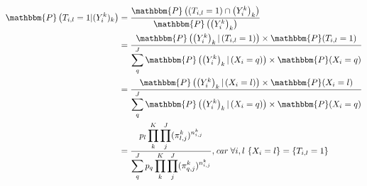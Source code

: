 \documentclass[frenchb]{report}
\newcommand{\1}{\mathbbm{1}}
\newcommand{\prob}{\mathbbm{P}}
\theoremstyle{definition}\newtheorem{defn}{Définition}
\theoremstyle{definition}\newtheorem{exm}{Exemple}
\theoremstyle{definition}\newtheorem{nota}{Notation}
\theoremstyle{definition}\newtheorem{rem}{Remarque}
\begin{document}
\begin{center}
	\begin{align*}
		\prob\left( T_{i,l} = 1 |(Y^k_i)_k \right) &= \displaystyle \frac{\prob \left( \left( T_{i,l} = 1 \right) \cap \left(Y^k_i\right)_k\right)}{\prob \left( \left( Y^k_i \right)_k \right)}\\
		&= \displaystyle \frac{\prob \left( \left(Y^k_i \right)_k | \left( T_{i,l} =1 \right) \right) \times \prob (T_{i,l} = 1)}{\displaystyle \sum_q^J \prob \left( \left(Y^k_i \right)_k | \left( X_i = q \right) \right) \times \prob (X_i = q)}\\
		&= \displaystyle \frac{\prob \left( \left(Y^k_i \right)_k | \left( X_i = l \right) \right) \times \prob (X_i = l)}{\displaystyle \sum_q^J \prob \left( \left(Y^k_i \right)_k | \left( X_i = q \right) \right) \times \prob (X_i = q)}\\
		&= \displaystyle \frac{p_l \displaystyle \prod_k^K \displaystyle \prod_j^J (\pi^k_{l,j})^{n^k_{i,j}}}{\displaystyle \sum_q^J p_q \displaystyle \prod_k^K \displaystyle \prod_j^J (\pi^k_{q,j})^{n^k_{i,j}}}, \textit{car } \forall i,l ~\{X_i = l\} = \{T_{i,l} = 1\}\\
	\end{align*}
\end{center}
\end{document}
